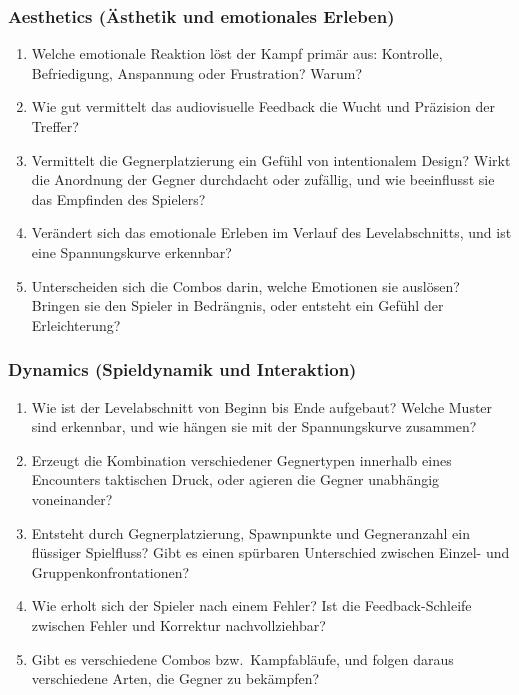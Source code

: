 \documentclass[../Main.tex]{subfiles}
\begin{document}
\subsubsection{Aesthetics (Ästhetik und emotionales Erleben)}

\begin{enumerate}[label=\textbf{A\arabic*}, leftmargin=1.5cm, itemsep=0.5em]
    \item Welche emotionale Reaktion löst der Kampf primär aus: Kontrolle, Befriedigung, Anspannung oder Frustration? Warum?
    \item Wie gut vermittelt das audiovisuelle Feedback die Wucht und Präzision der Treffer?
    \item Vermittelt die Gegnerplatzierung ein Gefühl von intentionalem Design? Wirkt die Anordnung der Gegner durchdacht oder zufällig, und wie beeinflusst sie das Empfinden des Spielers?
    \item Verändert sich das emotionale Erleben im Verlauf des Levelabschnitts, und ist eine Spannungskurve erkennbar?
    \item Unterscheiden sich die Combos darin, welche Emotionen sie auslösen? Bringen sie den Spieler in Bedrängnis, oder entsteht ein Gefühl der Erleichterung?
\end{enumerate}

\subsubsection{Dynamics (Spieldynamik und Interaktion)}

\begin{enumerate}[label=\textbf{D\arabic*}, leftmargin=1.5cm, itemsep=0.5em]
    \item Wie ist der Levelabschnitt von Beginn bis Ende aufgebaut? Welche Muster sind erkennbar, und wie hängen sie mit der Spannungskurve zusammen?
    \item Erzeugt die Kombination verschiedener Gegnertypen innerhalb eines Encounters taktischen Druck, oder agieren die Gegner unabhängig voneinander?
    \item Entsteht durch Gegnerplatzierung, Spawnpunkte und Gegneranzahl ein flüssiger Spielfluss? Gibt es einen spürbaren Unterschied zwischen Einzel- und Gruppenkonfrontationen?
    \item Wie erholt sich der Spieler nach einem Fehler? Ist die Feedback-Schleife zwischen Fehler und Korrektur nachvollziehbar?
    \item Gibt es verschiedene Combos bzw.\ Kampfabläufe, und folgen daraus verschiedene Arten, die Gegner zu bekämpfen?
\end{enumerate}
\end{document}
